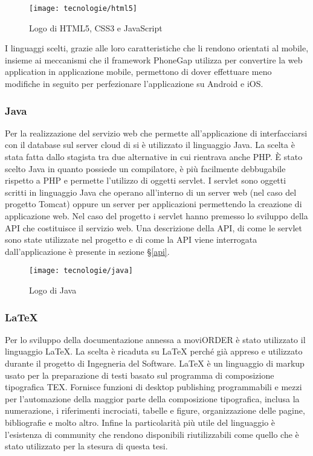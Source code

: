\begin{figure}[!h] 
    \centering 
    	\texttt{[image: tecnologie/html5]}
    \caption{Logo di HTML5, CSS3 e JavaScript}
\end{figure}

I linguaggi scelti, grazie alle loro caratteristiche che li rendono orientati al mobile, insieme ai meccanismi che il framework PhoneGap utilizza per convertire la web application in applicazione mobile, permettono di dover effettuare meno modifiche in seguito per perfezionare l'applicazione su Android e iOS.

\subsubsection{Java}

Per la realizzazione del servizio web che permette all'applicazione di interfacciarsi con il database sul server cloud di \visione{} si è utilizzato il linguaggio Java. La scelta è stata fatta dallo stagista tra due alternative in cui rientrava anche PHP. È stato scelto Java in quanto possiede un compilatore, è più facilmente debbugabile rispetto a PHP e permette l'utilizzo di oggetti servlet.  I servlet sono oggetti scritti in linguaggio Java che operano all'interno di un server web (nel caso del progetto Tomcat) oppure un server per applicazioni permettendo la creazione di applicazione web. Nel caso del progetto i servlet hanno premesso lo sviluppo della API che costituisce il servizio web. Una descrizione della API, di come le servlet sono state utilizzate nel progetto e di come la API viene interrogata dall'applicazione è presente in sezione §\ref{api}.

\begin{figure}[!h] 
    \centering 
    \texttt{[image: tecnologie/java]} 
    \caption{Logo di Java}
\end{figure}

\subsubsection{\LaTeX{}}

Per lo sviluppo della documentazione annessa a moviORDER è stato utilizzato il linguaggio \LaTeX{}. La scelta è ricaduta su \LaTeX{} perché già appreso e utilizzato durante il progetto di Ingegneria del Software. \LaTeX{} è un linguaggio di markup usato per la preparazione di testi basato sul programma di composizione tipografica TEX. Fornisce funzioni di desktop publishing programmabili e mezzi per l'automazione della maggior parte della composizione tipografica, inclusa la numerazione, i riferimenti incrociati, tabelle e figure, organizzazione delle pagine, bibliografie e molto altro. Infine la particolarità più utile del linguaggio è l'esistenza di community che rendono disponibili  riutilizzabili come quello che è stato utilizzato per la stesura di questa tesi.

